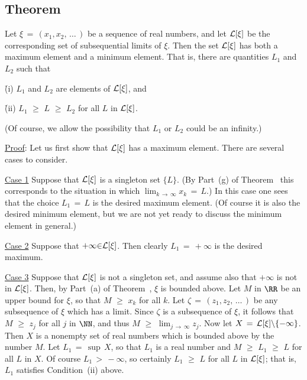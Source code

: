 {            \subsection{\small{\bf Theorem}}
            \label{ThmC50.140}

        Let ${\xi} \,=\, (x_{1},x_{2},\,{\ldots}\,)$ be a sequence of real numbers, and let ${\cal L}[{\xi}]$ be the corresponding set of subsequential limits of ${\xi}$.
    Then the set ${\cal L}[{\xi}]$ has both a maximum element and a minimum element.
    That is, there are quantities $L_{1}$ and $L_{2}$ such that

       \h (i) $L_{1}$ and $L_{2}$ are elements of ${\cal L}[{\xi}]$, and

       \h (ii) $L_{1}\,\,{\geq}\,\,L\,\,{\geq}\,\,L_{2}$ for all $L$ in ${\cal L}[{\xi}]$.

\noindent (Of course, we allow the possibility that $L_{1}$ or $L_{2}$ could be an infinity.)


\V

        \underline{Proof}: Let us first show that ${\cal L}[{\xi}]$ has a maximum element.
    There are several cases to consider.

\V

        \underline{Case 1} Suppose that ${\cal L}[{\xi}]$ is a singleton set $\{L\}$.
    (By Part~(g) of Theorem~ this corresponds to the situation in which $\lim_{k \,{\rightarrow}\, {\infty}} x_{k} \,=\, L$.)
    In this case one sees that the choice $L_{1} \,=\, L$ is the desired maximum element.
    (Of course it is also the desired minimum element, but we are not yet ready to discuss the minimum element in general.)

\V

        \underline{Case 2} Suppose that $+{\infty}{\in}{\cal L}[{\xi}]$.
    Then clearly $L_{1} \,=\, +{\infty}$ is the desired maximum.

\V

        \underline{Case 3} Suppose that ${\cal L}[{\xi}]$ is not a singleton set, and assume also that $+{\infty}$ is not in ${\cal L}[{\xi}]$.
    Then, by Part~(a) of Theorem~, ${\xi}$ is bounded above.
    Let $M$ in ${\RR}$ be an upper bound for ${\xi}$, so that $M\,\,{\geq}\,\,x_{k}$ for all $k$.
    Let ${\zeta} \,=\, (z_{1},z_{2},\,{\ldots}\,)$ be any subsequence of ${\xi}$ which has a limit.
    Since ${\zeta}$ is a subsequence of ${\xi}$, it follows that $M\,\,{\geq}\,\,z_{j}$ for all $j$ in ${\NN}$, and thus $M\,\,{\geq}\,\,\lim_{j \,{\rightarrow}\, {\infty}} z_{j}$.
    Now let $X \,=\, {\cal L}[{\xi}]{\setminus}\{-{\infty}\}$.
    Then $X$ is a nonempty set of real numbers which is bounded above by the number $M$.
    Let $L_{1} \,=\, {\sup}\,X$, so that $L_{1}$ is a real number and $M\,\,{\geq}\,\,L_{1}\,\,{\geq}\,\,L$ for all $L$ in $X$.
    Of course $L_{1}\,>\,-{\infty}$, so certainly $L_{1}\,\,{\geq}\,\,L$ for all $L$ in ${\cal L}[{\xi}]$; that is, $L_{1}$ satisfies Condition~(ii) above.

}
